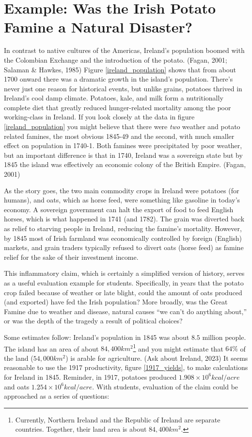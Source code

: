 \documentclass[man]{apa7}
\begin{document}
\section{Example: Was the Irish Potato Famine a Natural Disaster?}
In contrast to native cultures of the Americas, Ireland's population boomed with the Colombian Exchange and the introduction of the potato. (Fagan, 2001; Salaman \& Hawkes, 1985)
Figure \ref{ireland_population} shows that from about 1700 onward there was a dramatic growth in the island's population.  There's never just one reason for historical events, but unlike grains, potatoes thrived in Ireland's cool damp climate. Potatoes, kale, and milk form a nutritionally complete diet that greatly reduced hunger-related mortality among the poor working-class in Ireland.  If you look closely at the data in figure \ref{ireland_population} you might believe that there were \textit{two} weather and potato related famines, the most obvious 1845-49 and the second, with much smaller effect on population in 1740-1.  Both famines were precipitated by poor weather, but an important difference is that in 1740, Ireland was a sovereign state but by 1845 the island was effectively an economic colony of the British Empire. (Fagan, 2001)

As the story goes, the two main commodity crops in Ireland were potatoes (for humans), and oats, which as horse feed, were something like gasoline in today's economy.  A sovereign government can halt the export of food to feed English horses, which is what happened in 1741 (and 1782). The grain was diverted back as relief to starving people in Ireland, reducing the famine's mortality. However, by 1845 most of Irish farmland was economically controlled by foreign (English) markets, and grain traders typically refused to divert oats (horse feed) as famine relief for the sake of their investment income.

This inflammatory claim, which is certainly a simplified version of history, serves as a useful evaluation example for students. Specifically, in years that the potato crop failed because of weather or late blight, could the amount of oats produced (and exported) have fed the Irish population?  More broadly, was the Great Famine due to weather and disease, natural causes ``we can't do anything about,''  or was the depth of the tragedy a result of political choices?

Some estimates follow:  Ireland's population in 1845 was about $8.5$ million people.  The island has an area of about $84,400km^2$\footnote{
Currently, Northern Ireland and the Republic of Ireland are separate countries.  Together, their land area is about $84,400km^2$.
}
and you might estimate that $64\%$ of the land ($54,000km^2$) is arable for agriculture. (Ask about Ireland, 2023)
It seems reasonable to use the 1917 productivity,  figure \ref{1917_yields},  to make calculations for Ireland in 1845.  Reminder, in 1917, potatoes produced $1.908\times10^6 kcal/acre$ and oats $1.254\times10^6kcal/acre$.
With students, evaluation of the claim could be approached as a series of questions:
\end{document}
